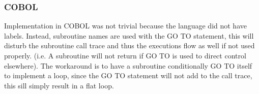 \documentclass[11pt, a4paper, fleqn, oneside]{article}
\begin{document}
\subsubsection*{COBOL}
Implementation in COBOL was not trivial because the language did not have labels. Instead,
subroutine names are used with the GO TO statement, this will disturb the subroutine call
trace and thus the executions flow as well if not used properly. (i.e. A subroutine will not
return if GO TO is used to direct control elsewhere). The workaround is to have a subroutine
conditionally GO TO itself to implement a loop, since the GO TO statement will not add to
the call trace, this sill simply result in a flat loop.
\end{document}
